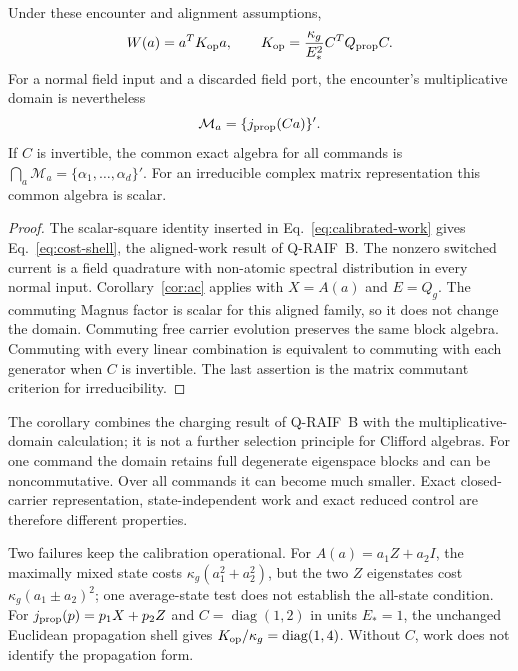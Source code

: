 \begin{corollary}
\label{cor:aligned-exact}
Under these encounter and alignment assumptions,
\begin{equation}
 W(a)=a^TK_{\rm op}a,\qquad
 K_{\rm op}=\frac{\kappa_g}{E_*^2}C^TQ_{\rm prop}C.
 \label{eq:cost-shell}
\end{equation}
For a normal field input and a discarded field port, the encounter's
multiplicative domain is nevertheless
\begin{equation}
 \mathcal M_a=\{j_{\rm prop}(Ca)\}'.
 \label{eq:aligned-domain}
\end{equation}
If $C$ is invertible, the common exact algebra for all commands is
$\bigcap_a\mathcal M_a=\{\alpha_1,\ldots,\alpha_d\}'$.
For an irreducible complex matrix representation this common algebra
is scalar.
\end{corollary}
\begin{proof}
The scalar-square identity inserted in Eq.~\eqref{eq:calibrated-work}
gives Eq.~\eqref{eq:cost-shell}, the aligned-work result of
Q-RAIF~B. The nonzero switched current is a field quadrature with
non-atomic spectral distribution in every normal input.
Corollary~\ref{cor:ac} applies with $X=A(a)$ and $E=Q_g$.
The commuting Magnus factor is scalar for this aligned family, so
it does not change the domain. Commuting free carrier evolution
preserves the same block algebra. Commuting with every linear
combination is equivalent to commuting with each generator when
$C$ is invertible. The last assertion is the matrix commutant
criterion for irreducibility.
\end{proof}

The corollary combines the charging result of Q-RAIF~B with the
multiplicative-domain calculation; it is not a further selection
principle for Clifford algebras. For one command the domain retains
full degenerate eigenspace blocks and can be noncommutative.
Over all commands it can become much smaller.
Exact closed-carrier representation, state-independent work and
exact reduced control are therefore different properties.

Two failures keep the calibration operational. For
$A(a)=a_1Z+a_2I$, the maximally mixed state costs
$\kappa_g(a_1^2+a_2^2)$, but the two $Z$ eigenstates cost
$\kappa_g(a_1\pm a_2)^2$; one average-state test does not establish
the all-state condition. For $j_{\rm prop}(p)=p_1X+p_2Z$ and
$C=\operatorname{diag}(1,2)$ in units $E_*=1$, the unchanged
Euclidean propagation shell gives
$K_{\rm op}/\kappa_g=\operatorname{diag}(1,4)$.
Without $C$, work does not identify the propagation form.

